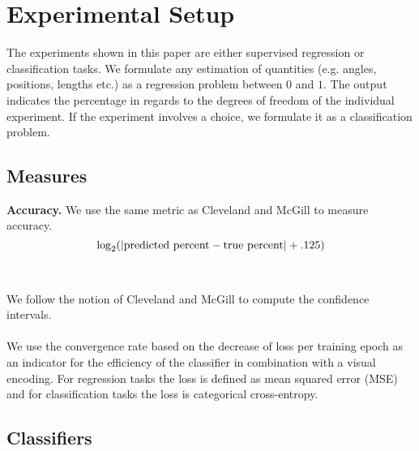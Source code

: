 
\section{Experimental Setup}

The experiments shown in this paper are either supervised regression or classification tasks. We formulate any estimation of quantities (e.g. angles, positions, lengths etc.) as a regression problem between $0$ and $1$. The output indicates the percentage in regards to the degrees of freedom of the individual experiment. If the experiment involves a choice, we formulate it as a classification problem.

\subsection{Measures}

\textbf{Accuracy.} We use the same metric as Cleveland and McGill to measure accuracy.
\begin{equation}
	\log_2( | \textnormal{predicted percent} - \textnormal{true percent} | + .125)
\end{equation}
\\~\\
 We follow the notion of Cleveland and McGill to compute the confidence intervals.
\\~\\
 We use the convergence rate based on the decrease of loss per training epoch as an indicator for the efficiency of the classifier in combination with a visual encoding. For regression tasks the loss is defined as mean squared error (MSE) and for classification tasks the loss is categorical cross-entropy.

\subsection{Classifiers}

